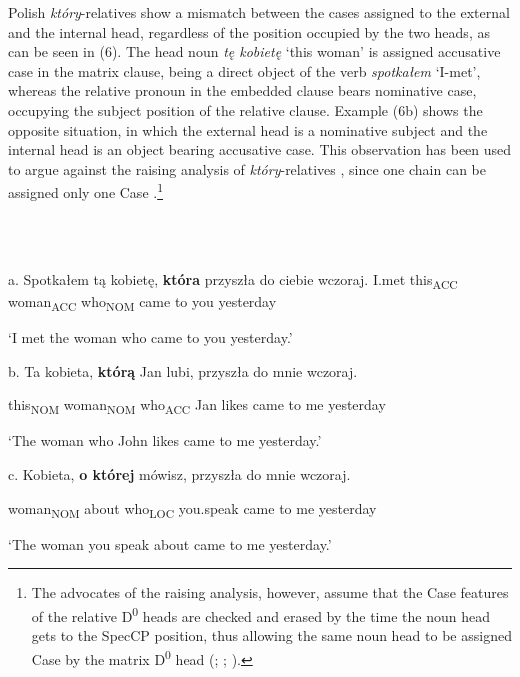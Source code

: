 \documentclass[output=paper]{langsci/langscibook}
\begin{document}
Polish \textit{który}{}-relatives show a mismatch between the cases assigned to the external and the internal head, regardless of the position occupied by the two heads, as can be seen in (6). The head noun \textit{tę kobietę} ‘this woman’ is assigned accusative case in the matrix clause, being a direct object of the verb \textit{spotkałem} ‘I-met’, whereas the relative pronoun in the embedded clause bears nominative case, occupying the subject position of the relative clause. Example (6b) shows the opposite situation, in which the external head is a nominative subject and the internal head is an object bearing accusative case. This observation has been used to argue against the raising analysis of \textit{który}{}-relatives \citep{Borsley1997}, since one chain can be assigned only one Case \citep{Chomsky1982}.\footnote{The advocates of the raising analysis, however, assume that the Case features of the relative D\textsuperscript{0} heads are checked and erased by the time the noun head gets to the SpecCP position, thus allowing the same noun head to be assigned Case by the matrix D\textsuperscript{0} head (\citealt{Kayne1994}; \citealt{Bianchi2000}; \citealt{Citko2004}).}

\ea%
    \label{ex:key:6}
    \gll\\
        \\
    \glt
    \z

          a.   Spotkałem   tą   kobietę,   \textbf{która}   przyszła  do  ciebie   wczoraj.        I.met   this\textsubscript{ACC}   woman\textsubscript{ACC}   who\textsubscript{NOM}   came   to  you  yesterday

    ‘I met the woman who came to you yesterday.’

  b.  Ta     kobieta,   \textbf{którą}   Jan  lubi,  przyszła  do  mnie  wczoraj.  

    this\textsubscript{NOM}   woman\textsubscript{NOM}   who\textsubscript{ACC}   Jan likes   came   to  me   yesterday

    ‘The woman who John likes came to me yesterday.’

  c.   Kobieta,   \textbf{o  której}   mówisz,   przyszła  do  mnie   wczoraj.

    woman\textsubscript{NOM}  about   who\textsubscript{LOC}   you.speak   came   to   me   yesterday

    ‘The woman you speak about came to me yesterday.’
\end{document}

